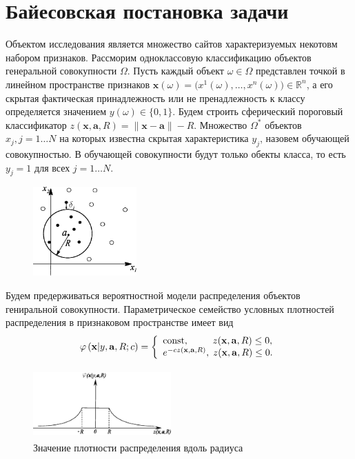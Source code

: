 \section{Байесовская постановка задачи}
Объектом исследования является множество сайтов характеризуемых некотовм набором признаков.
Рассморим одноклассовую классификацию объектов генеральной совокупности $\Omega$.
Пусть каждый объект $\omega \in{\Omega}$  представлен точкой в линейном пространстве признаков
$\mathbf{x}(\omega)=\bigl(x^{1}(\omega),\ldots,x^{n}(\omega)\bigr) \in {\mathbb{R}^n}$,
а его скрытая фактическая принадлежность или не пренадлежность к классу
определяется значением $y(\omega)\in{\{0,1\}}$. Будем строить сферический пороговый классификатор
$z(\mathbf{x},\mathbf{a},R)=\left\|\mathbf{x}-\mathbf{a}\right\|-R$. Множество $\Omega^*$ объектов 
$x_j, j=1 \ldots N$ на которых известна скрытая характеристика $y_j$, назовем обучающей совокупностью. 
В обучающей совокупности будут только обекты класса, то есть $y_j=1$ для всех $j=1\ldots N$.

\begin{figure}[H]
\includegraphics[width=150px, height=130px]{fig1.eps}
\end{figure}

Будем предерживаться вероятностной модели распределения объектов гениральной совокупности. 
Параметрическое семейство условных плотностей распределения в признаковом пространстве имеет вид 
\begin{equation}
\label{prob1}
   \varphi \left( {\mathbf x | y,\mathbf{a},R;c} \right) =
   \left\{\begin{array}{l}
   {{\rm const}},\;\;\;\;\;\;\;\;\;z(\mathbf{x},\mathbf{a},R) \leq 0, \\
   e^{-c z(\mathbf{x},\mathbf{a},R)},\;z(\mathbf{x},\mathbf{a},R) \leq 0.
 \end{array}\right.
\vspace{-5pt}
\end{equation}

\begin{figure}[H]
\includegraphics[width=200px, height=100px]{fig2.eps}
\caption{Значение плотности распределения вдоль радиуса}
\end{figure}

